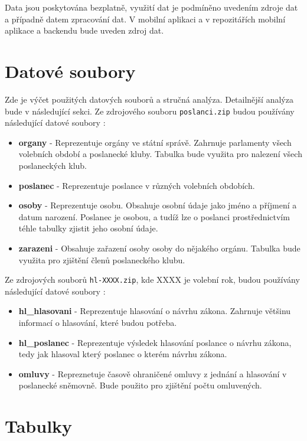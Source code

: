 Data jsou poskytována bezplatně, využití dat je podmíněno uvedením zdroje dat a případně datem zpracování dat. V mobilní aplikaci a v repozitářích mobilní aplikace a backendu bude uveden zdroj dat. 

\section{Datové soubory}

Zde je výčet použitých datových souborů a stručná analýza. Detailnější analýza bude v následující sekci. Ze zdrojového souboru \lstinline|poslanci.zip| budou používány následující datové soubory \cite{zip-members}:

\begin{itemize}
	\item \textbf{organy} - Reprezentuje orgány ve státní správě. Zahrnuje parlamenty všech volebních období a poslanecké kluby. Tabulka bude využita pro nalezení všech poslaneckých klub.
	\item \textbf{poslanec} - Reprezentuje poslance v různých volebních obdobích.
	\item \textbf{osoby} - Reprezentuje osobu. Obsahuje osobní údaje jako jméno a příjmení a datum narození. Poslanec je osobou, a tudíž lze o poslanci prostřednictvím téhle tabulky zjistit jeho osobní údaje.
	\item \textbf{zarazeni} - Obsahuje zařazení osoby osoby do nějakého orgánu. Tabulka bude využita pro zjištění členů poslaneckého klubu.
\end{itemize}

\noindent Ze zdrojových souborů \lstinline|hl-XXXX.zip|, kde XXXX je volební rok, budou používány následující datové soubory \cite{zip-votes}:

\begin{itemize}
	\item \textbf{hl\_hlasovani} - Reprezentuje hlasování o návrhu zákona. Zahrnuje většinu informací o hlasování, které budou potřeba.
	\item \textbf{hl\_poslanec} - Reprezentuje výsledek hlasování poslance o návrhu zákona, tedy jak hlasoval který poslanec o kterém návrhu zákona.
	\item \textbf{omluvy} - Repreznetuje časově ohraničené omluvy z jednání a hlasování v poslanecké sněmovně. Bude použito pro zjištění počtu omluvených. 
\end{itemize}

\section{Tabulky}

